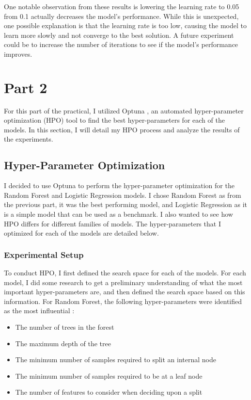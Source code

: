\documentclass{article}
\begin{document}
\noindent One notable observation from these results is lowering the learning rate to 0.05 from 0.1 actually decreases the model's performance. While this is unexpected, one possible explanation is that the learning rate is too low, causing the model to learn more slowly and not converge to the best solution. A future experiment could be to increase the number of iterations to see if the model's performance improves. 

\section{Part 2}
For this part of the practical, I utilized Optuna \cite{optuna_2019}, an automated hyper-parameter optimization (HPO) tool to find the best hyper-parameters for each of the models. In this section, I will detail my HPO process and analyze the results of the experiments.

\subsection{Hyper-Parameter Optimization}
I decided to use Optuna to perform the hyper-parameter optimization for the Random Forest and Logistic Regression models. I chose Random Forest as from the previous part, it was the best performing model, and Logistic Regression as it is a simple model that can be used as a benchmark. I also wanted to see how HPO differs for different families of models. The hyper-parameters that I optimized for each of the models are detailed below.

\subsubsection{Experimental Setup}
To conduct HPO, I first defined the search space for each of the models. For each model, I did some research to get a preliminary understanding of what the most important hyper-parameters are, and then defined the search space based on this information. For Random Forest, the following hyper-parameters were identified as the most influential \cite{Thorn_2021}:

\begin{itemize}
  \item {} The number of trees in the forest
  \item {} The maximum depth of the tree
  \item {}  The minimum number of samples required to split an internal node
  \item {} The minimum number of samples required to be at a leaf node
  \item {} The number of features to consider when deciding upon a split
\end{itemize}
\end{document}
